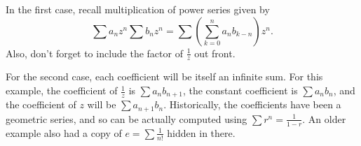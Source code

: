 \documentclass[10pt]{article}
\begin{document}
\begin{enumerate}
	In the first case, recall multiplication of power series given by \[\sum a_n z^n \sum b_n z^n = \sum (\sum_{k=0}^n a_n b_{k-n}) z^n.\] Also, don't forget to include the factor of $\frac{1}{z}$ out front. 
	
	For the second case, each coefficient will be itself an infinite sum. For this example, the coefficient of $\frac{1}{z}$ is $\sum a_n b_{n+1}$, the constant coefficient is $\sum a_n b_n$, and the coefficient of $z$ will be $\sum a_{n+1}b_n$. Historically, the coefficients have been a geometric series, and so can be actually computed using $\sum r^n = \frac{1}{1-r}$. An older example also had a copy of $e =  \sum \frac{1}{n!}$ hidden in there.
\end{enumerate}
\end{document}
